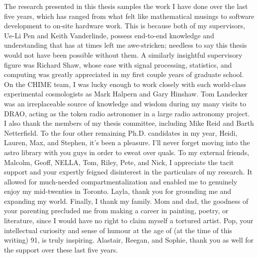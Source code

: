 \documentclass[12pt]{ut-thesis}
\begin{document}
\begin{preliminary}
\begin{acknowledgements}
   The research presented in this thesis samples the work 
   I have done over the last five years, which has 
   ranged from what felt like mathematical musings to software development  
   to on-site hardware work. This is because both of my supervisors, 
   Ue-Li Pen and Keith Vanderlinde, possess end-to-end knowledge 
   and understanding that has at times left me awe-stricken; 
   needless to say this thesis would not have been possible without them. 
   A similarly insightful supervisory figure was Richard Shaw, 
   whose ease with signal processing, statistics, and computing 
   was greatly appreciated in my first couple years of graduate school. 
   On the CHIME team, I was lucky enough to work closely 
   with such world-class experimental cosmologists as Mark Halpern 
   and Gary Hinshaw. Tom Landecker was an irreplaceable source 
   of knowledge and wisdom during my many 
   visits to DRAO, acting as the token radio astronomer in a 
   large radio astronomy project. I also thank the members of my 
   thesis committee, including Mike Reid and Barth Netterfield. 
   To the four other remaining Ph.D. candidates in my year,
   Heidi, Lauren, Max, and Stephen, it's been a pleasure. I'll 
   never forget moving into the astro library with you guys 
   in order to sweat over quals. To my external friends, Malcolm,
   Geoff, NELLA, Tom, Riley, Pete, and Nick, I appreciate the tacit 
   support and your expertly feigned disinterest in the particulars 
   of my research. It allowed for much-needed compartmentalization 
   and enabled me to genuinely enjoy my mid-twenties in Toronto. 
   Layla, thank you for grounding me and expanding my world.
   Finally, I thank my family. Mom and dad, the goodness of your 
   parenting precluded me from 
   making a career in painting, poetry, or literature, since I 
   would have no right to claim myself a tortured artist. Pop, 
   your intellectual curiosity and sense of humour 
   at the age of (at the time of this writing) 91, 
   is truly inspiring. Alastair, Reegan, and Sophie, thank you 
   as well for the support over these last five years.

\end{acknowledgements}



\end{preliminary}
\end{document}
